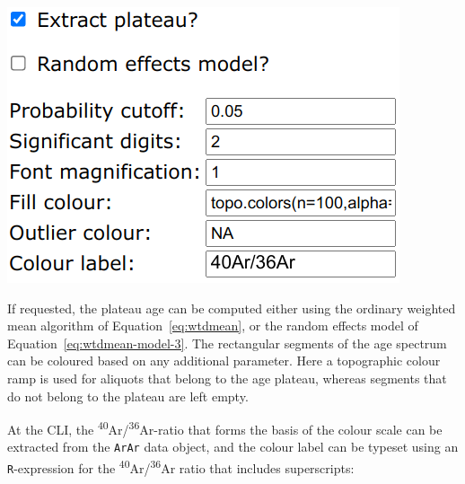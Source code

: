 \begin{refsection}
\noindent\begin{minipage}[t]{.4\linewidth}
\strut\vspace*{-\baselineskip}\newline
\includegraphics[width=\linewidth]{../figures/ArArAgeSpectrumOtherOptions.png}\\
\end{minipage}
\begin{minipage}[t]{.6\linewidth}
  If requested, the plateau age can be computed either using the
  ordinary weighted mean algorithm of Equation~\ref{eq:wtdmean}, or
  the random effects model of Equation~\ref{eq:wtdmean-model-3}.  The
  rectangular segments of the age spectrum can be coloured based on
  any additional parameter. Here a topographic colour ramp is used for
  aliquots that belong to the age plateau, whereas segments that do
  not belong to the plateau are left empty.
\end{minipage}

At the CLI, the \textsuperscript{40}Ar/\textsuperscript{36}Ar-ratio
that forms the basis of the colour scale can be extracted from the
\texttt{ArAr} data object, and the colour label can be typeset using
an \texttt{R}-expression for the
\textsuperscript{40}Ar/\textsuperscript{36}Ar ratio that includes
superscripts:

  

\end{refsection}
